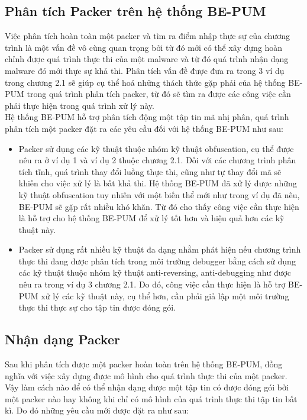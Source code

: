 \subsection {Phân tích Packer trên hệ thống BE-PUM}

\hspace{0.5cm}Việc phân tích hoàn toàn một packer và tìm ra điểm nhập thực sự của chương trình là một vấn đề vô cùng quan trọng bởi từ đó mới có thể xây dựng hoàn chỉnh được quá trình thực thi của một malware và từ đó quá trình nhận dạng malware đó mới thực sự khả thi. Phân tích vấn đề được đưa ra trong 3 ví dụ trong chương 2.1 sẽ giúp cụ thể hoá những thách thức gặp phải của hệ thống BE-PUM trong quá trình phân tích packer, từ đó sẽ tìm ra được các công việc cần phải thực hiện trong quá trình xử lý này.\\

\hspace{0.5cm}Hệ thống BE-PUM hỗ trợ phân tích động một tập tin mã nhị phân, quá trình phân tích một packer đặt ra các yêu cầu đối với hệ thống BE-PUM như sau:

\begin{itemize}
\item{Packer sử dụng các kỹ thuật thuộc nhóm kỹ thuật obfuscation, cụ thể được nêu ra ở ví dụ 1 và ví dụ 2 thuộc chương 2.1. Đối với các chương trình phân tích tĩnh, quá trình thay đổi luồng thực thi, cũng như tự thay đổi mã sẽ khiến cho việc xử lý là bất khả thi. Hệ thống BE-PUM đã xử lý được những kỹ thuật obfuscation tuy nhiên với một biến thể mới như trong ví dụ đã nêu, BE-PUM sẽ gặp rất nhiều khó khăn. Từ đó cho thấy công việc cần thực hiện là hỗ trợ cho hệ thống BE-PUM để xử lý tốt hơn và hiệu quả hơn các kỹ thuật này.\\}
\item{Packer sử dụng rất nhiều kỹ thuật đa dạng nhằm phát hiện nếu chương trình thực thi đang được phân tích trong môi trường debugger bằng cách sử dụng các kỹ thuật thuộc nhóm kỹ thuật anti-reversing, anti-debugging như được nêu ra trong ví dụ 3 chương 2.1. Do đó, công việc cần thực hiện là hỗ trợ BE-PUM xử lý các kỹ thuật này, cụ thể hơn, cần phải giả lập một môi trường thực thi thực sự cho tập tin được đóng gói.}
\end{itemize}

\subsection {Nhận dạng Packer}

\hspace{0.5cm}Sau khi phân tích được một packer hoàn toàn trên hệ thống BE-PUM, đồng nghĩa với việc xây dựng được mô hình cho quá trình thực thi của một packer. Vậy làm cách nào để có thể nhận dạng được một tập tin có được đóng gói bởi một packer nào hay không khi chỉ có mô hình của quá trình thực thi tập tin bất kì. Do đó những yêu cầu mới được đặt ra như sau:

